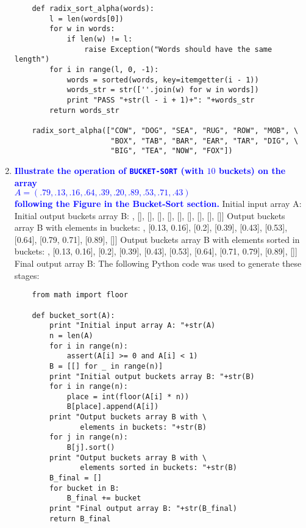 \documentclass{article}
\begin{document}
\begin{enumerate}
\begin{verbatim}
    def radix_sort_alpha(words):
        l = len(words[0])
        for w in words:
            if len(w) != l:
                raise Exception("Words should have the same length")
        for i in range(l, 0, -1):
            words = sorted(words, key=itemgetter(i - 1))
            words_str = str([''.join(w) for w in words])
            print "PASS "+str(l - i + 1)+": "+words_str
        return words_str
            
    radix_sort_alpha(["COW", "DOG", "SEA", "RUG", "ROW", "MOB", \
                      "BOX", "TAB", "BAR", "EAR", "TAR", "DIG", \
                      "BIG", "TEA", "NOW", "FOX"])
    \end{verbatim}

\item \textbf{\textcolor{blue}{Illustrate the operation of {\tt BUCKET-SORT} 
(with $10$ buckets)
on the
array \\ $A=(.79,.13,.16,.64,.39,.20,.89,.53,.71,.43)$ \\  following
the Figure in the Bucket-Sort section.}}
    \newline\newline Initial input array A: 
    \newline [0.79, 0.13, 0.16, 0.64, 0.39, 0.2, 0.89, 0.53, 0.71, 0.43]
    \newline Initial output buckets array B:
    \newline [[], [], [], [], [], [], [], [], [], []]
    \newline Output buckets array B with elements in buckets:
    \newline [[], [0.13, 0.16], [0.2], [0.39], [0.43], [0.53], [0.64], [0.79, 0.71], [0.89], []]
    \newline Output buckets array B with elements sorted in buckets:
    \newline [[], [0.13, 0.16], [0.2], [0.39], [0.43], [0.53], [0.64], [0.71, 0.79], [0.89], []]
    \newline Final output array B:
    \newline [0.13, 0.16, 0.2, 0.39, 0.43, 0.53, 0.64, 0.71, 0.79, 0.89]
    \newline The following Python code was used to generate these stages:
    \begin{verbatim}
    from math import floor
                 
    def bucket_sort(A):
        print "Initial input array A: "+str(A)
        n = len(A)
        for i in range(n):
            assert(A[i] >= 0 and A[i] < 1)
        B = [[] for _ in range(n)]
        print "Initial output buckets array B: "+str(B)
        for i in range(n):
            place = int(floor(A[i] * n))
            B[place].append(A[i])
        print "Output buckets array B with \
               elements in buckets: "+str(B)
        for j in range(n):
            B[j].sort()
        print "Output buckets array B with \
               elements sorted in buckets: "+str(B)
        B_final = []
        for bucket in B:
            B_final += bucket
        print "Final output array B: "+str(B_final)
        return B_final
        

\end{verbatim}
\end{enumerate}
\end{document}
